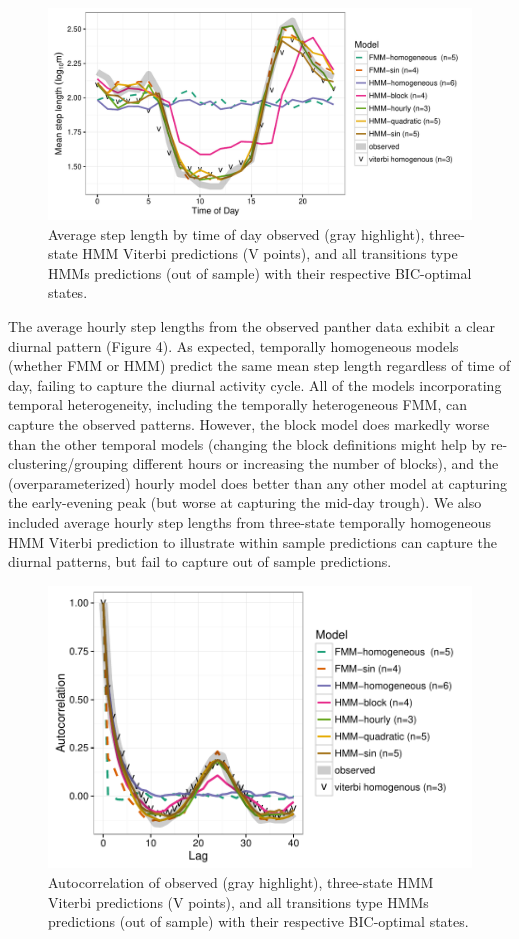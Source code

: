 \documentclass{bmcart}
\begin{document}
\begin{figure}[h!]
   \includegraphics[width=5in]{figure/avg_step_length_by_time-1}
  \caption{ Average step length by time of day observed (gray highlight), three-state HMM Viterbi predictions (V points), and all transitions type HMMs predictions (out of sample) with their respective BIC-optimal states.}
      \end{figure}

The average hourly step lengths from the observed panther data exhibit
a clear diurnal pattern (Figure 4). As expected, temporally
homogeneous models (whether FMM or HMM) predict the same mean step
length regardless of time of day, failing to capture the diurnal
activity cycle. All of the models incorporating temporal
heterogeneity, including the temporally heterogeneous FMM, can capture
the observed patterns. However, the block model does markedly worse
than the other temporal models (changing the block definitions might
help by re-clustering/grouping different hours or increasing the
number of blocks), and the (overparameterized) hourly model does
better than any other model at capturing the early-evening peak (but
worse at capturing the mid-day trough). We also included average
hourly step lengths from three-state temporally homogeneous HMM
Viterbi prediction to illustrate within sample predictions can capture
the diurnal patterns, but fail to capture out of sample predictions.

\begin{figure}[h!]
   \includegraphics[width=5in]{figure/acf_plot-1}
  \caption{ Autocorrelation of observed (gray highlight), three-state HMM Viterbi predictions (V points), and all transitions type HMMs predictions (out of sample) with their respective BIC-optimal states.}
      \end{figure}
\end{document}
